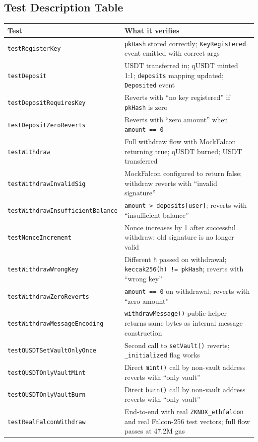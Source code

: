 \documentclass[11pt,a4paper]{article}
\begin{document}
\subsection{Test Description Table}

\begin{center}
\begin{tabular}{p{5.5cm}p{8cm}}
\toprule
\textbf{Test} & \textbf{What it verifies} \\
\midrule
\texttt{testRegisterKey} & \texttt{pkHash} stored correctly; \texttt{KeyRegistered} event emitted with correct args \\
\addlinespace
\texttt{testDeposit} & USDT transferred in; qUSDT minted 1:1; \texttt{deposits} mapping updated; \texttt{Deposited} event \\
\addlinespace
\texttt{testDepositRequiresKey} & Reverts with ``no key registered'' if \texttt{pkHash} is zero \\
\addlinespace
\texttt{testDepositZeroReverts} & Reverts with ``zero amount'' when \texttt{amount == 0} \\
\addlinespace
\texttt{testWithdraw} & Full withdraw flow with MockFalcon returning true; qUSDT burned; USDT transferred \\
\addlinespace
\texttt{testWithdrawInvalidSig} & MockFalcon configured to return false; withdraw reverts with ``invalid signature'' \\
\addlinespace
\texttt{testWithdrawInsufficientBalance} & \texttt{amount > deposits[user]}; reverts with ``insufficient balance'' \\
\addlinespace
\texttt{testNonceIncrement} & Nonce increases by 1 after successful withdraw; old signature is no longer valid \\
\addlinespace
\texttt{testWithdrawWrongKey} & Different \texttt{h} passed on withdrawal; \texttt{keccak256(h) != pkHash}; reverts with ``wrong key'' \\
\addlinespace
\texttt{testWithdrawZeroReverts} & \texttt{amount == 0} on withdrawal; reverts with ``zero amount'' \\
\addlinespace
\texttt{testWithdrawMessageEncoding} & \texttt{withdrawMessage()} public helper returns same bytes as internal message construction \\
\addlinespace
\texttt{testQUSDTSetVaultOnlyOnce} & Second call to \texttt{setVault()} reverts; \texttt{\_initialized} flag works \\
\addlinespace
\texttt{testQUSDTOnlyVaultMint} & Direct \texttt{mint()} call by non-vault address reverts with ``only vault'' \\
\addlinespace
\texttt{testQUSDTOnlyVaultBurn} & Direct \texttt{burn()} call by non-vault address reverts with ``only vault'' \\
\addlinespace
\texttt{testRealFalconWithdraw} & End-to-end with real \texttt{ZKNOX\_ethfalcon} and real Falcon-256 test vectors; full flow passes at 47.2M gas \\
\bottomrule
\end{tabular}
\end{center}
\end{document}
